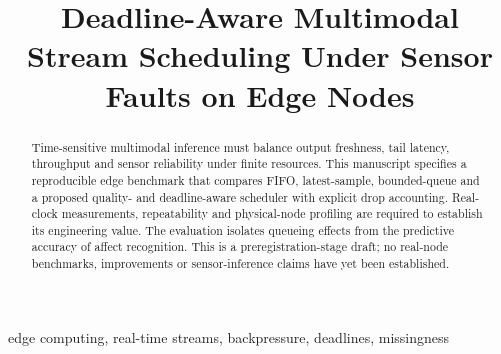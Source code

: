 \documentclass[conference]{IEEEtran}
\title{Deadline-Aware Multimodal Stream Scheduling Under Sensor Faults on Edge Nodes}
\author{\IEEEauthorblockN{Author information to be confirmed}\IEEEauthorblockA{Institutional affiliation to be confirmed}}
\begin{document}
\maketitle
\begin{abstract}
Time-sensitive multimodal inference must balance output freshness, tail latency, throughput and sensor reliability under finite resources. This manuscript specifies a reproducible edge benchmark that compares FIFO, latest-sample, bounded-queue and a proposed quality- and deadline-aware scheduler with explicit drop accounting. Real-clock measurements, repeatability and physical-node profiling are required to establish its engineering value. The evaluation isolates queueing effects from the predictive accuracy of affect recognition. This is a preregistration-stage draft; no real-node benchmarks, improvements or sensor-inference claims have yet been established.
\end{abstract}
\begin{IEEEkeywords}
edge computing, real-time streams, backpressure, deadlines, missingness
\end{IEEEkeywords}






\end{document}
